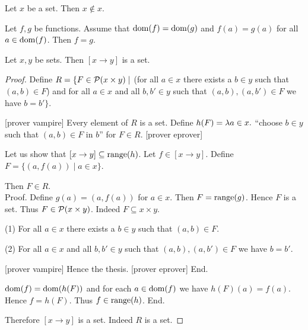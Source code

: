 \documentclass[10pt]{article}
\begin{document}
  \begin{forthel}
    \begin{corollary}[id=FOUNDATIONS_10_3086917813927936,printid]
      Let $x$ be a set.
      Then $x \notin x$.
    \end{corollary}
  \end{forthel}

  \begin{forthel}
    \begin{proposition}[id=FOUNDATIONS_10_4589652321021547,printid]
      Let $f, g$ be functions.
      Assume that $\operatorname{dom}(f) = \operatorname{dom}(g)$ and $f(a) = g(a)$ for all $a \in \operatorname{dom}(f)$.
      Then $f = g$.
    \end{proposition}
  \end{forthel}

  \begin{forthel}
    \begin{proposition}[id=FOUNDATIONS_10_4105036244189184,printid]
      Let $x, y$ be sets.
      Then $[x \to y]$ is a set.
    \end{proposition}
    \begin{proof}
      Define $R = \{ F \in \mathcal{P}(x \times y) \mid$ (for all $a \in x$ there exists a $b \in y$ such that $(a,b) \in F$) and for all $a \in x$ and all $b, b' \in y$ such that $(a,b), (a,b') \in F$ we have $b = b' \}$.

      [prover vampire]
      Every element of $R$ is a set. %
      Define $h(F) = \mathrm{\lambda} a \in x.$ ``choose $b \in y$ such that $(a,b) \in F$ in $b$'' for $F \in R$.
      [prover eprover]

      Let us show that $[x \to y] \subseteq \textrm{range}(h)$.
        Let $f \in [x \to y]$.
        Define $F = \{ (a,f(a)) \mid a \in x \}$.

        Then $F \in R$. \\
        Proof.
          Define $g(a) = (a,f(a))$ for $a \in x$.
          Then $F = \textrm{range}(g)$.
          Hence $F$ is a set.
          Thus $F \in \mathcal{P}(x \times y)$.
          Indeed $F \subseteq x \times y$.

          (1) For all $a \in x$ there exists a $b \in y$ such that $(a,b) \in F$.

          (2) For all $a \in x$ and all $b, b' \in y$ such that $(a,b),
          (a,b') \in F$ we have $b = b'$.

          [prover vampire]
          Hence the thesis.
          [prover eprover]
        End.

        $\operatorname{dom}(f) = \operatorname{dom}(h(F))$ and for each $a \in \operatorname{dom}(f)$ we have $h(F)(a) = f(a)$.
        Hence $f = h(F)$.
        Thus $f \in \textrm{range}(h)$.
      End.

      Therefore $[x \to y]$ is a set.
      Indeed $R$ is a set.
    \end{proof}
  \end{forthel}
\end{document}
